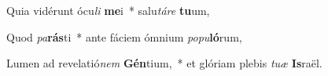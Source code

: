 \item Quia vidérunt ócu\textit{li} \textbf{me}i~* salu\textit{tá}\textit{re} \textbf{tu}um,
\item Quod \textit{pa}\textbf{rás}ti~* ante fáciem ómnium \textit{po}\textit{pu}\textbf{ló}rum,
\item Lumen ad revelatió\textit{nem} \textbf{Gén}tium,~* et glóriam plebis \textit{tu}\textit{æ} \textbf{Is}raël.
